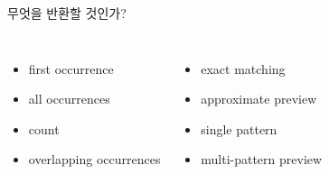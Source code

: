 \begin{frame}{무엇을 반환할 것인가?}
\begin{columns}[T]
\begin{itemize}\item first occurrence\item all occurrences\item count\item overlapping occurrences\end{itemize}
\begin{itemize}\item exact matching\item approximate preview\item single pattern\item multi-pattern preview\end{itemize}
\end{columns}
\end{frame}
